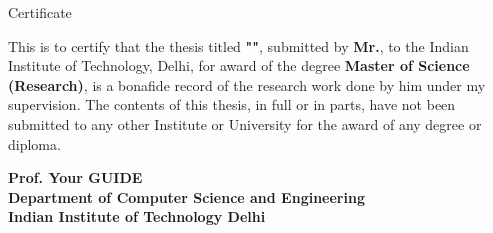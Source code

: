 \begin{center}
\LARGE{ Certificate} 
\end{center}

\vspace{0.5in}

\hspace*{1.0em} This is to certify that the thesis titled {\bf "\ThesisTitle"}, submitted by {\bf Mr.\Auth}, to the Indian Institute of Technology, Delhi, for award of the degree {\bf Master of Science (Research)}, is a bonafide record of the research work done by him under my supervision. The contents of this thesis, in full or in parts, have not been submitted to any other Institute or University for the award of any degree or diploma.

\vspace{1.5in}


{\bfseries Prof. Your GUIDE} \\
{\bfseries Department of Computer Science and Engineering} \\
{\bfseries Indian Institute of Technology Delhi}\\ 
